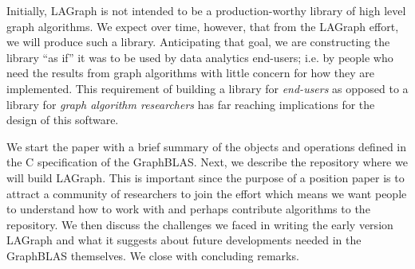 Initially, LAGraph is not intended to be a production-worthy library of 
high level graph algorithms.  We expect over time, however, that from the LAGraph 
effort, we will produce such a library.  Anticipating that goal, we are constructing
the library ``as if'' it was to be used by data analytics end-users; i.e. by people
who need the results from graph algorithms with little concern for how they are
implemented.  This requirement of building a library for \emph{end-users} as opposed to 
a library for \emph{graph algorithm researchers} has far reaching implications for the 
design of this software.

We start the paper with a brief summary of the objects and operations defined in
the C specification of the GraphBLAS.  Next, we describe
the repository where we will build LAGraph.  This is important since the
purpose of a position paper is to attract a community of researchers to join the effort
which means we want people to understand how to work with and perhaps contribute 
algorithms to the repository.  We then discuss the challenges we faced in writing the 
early version LAGraph and what it suggests about future developments needed in the
GraphBLAS themselves. We close with concluding remarks.














